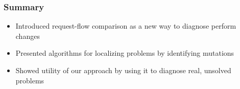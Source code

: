 \documentclass[11pt]{beamer}
\begin{document}
\appendix
\begin{frame}
\frametitle{Summary}
\begin{block}{}
\begin{itemize}
  \item Introduced request-flow comparison as a new way to diagnose perform
  changes
  \vskip5pt
  \item Presented algorithms for localizing problems by identifying mutations
  \vskip5pt
  \item Showed utility of our approach by using it to diagnose real, unsolved
  problems
\end{itemize}
\end{block}
\end{frame}

\newcount\opaqueness
\begin{frame}
\itshape
{}
\Large

\end{frame}
\end{document}
